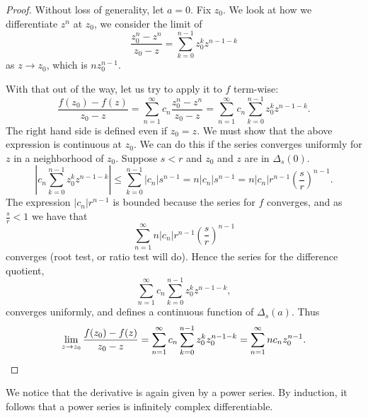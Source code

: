 \documentclass[12pt,openany]{book}
\newcommand{\sabs}[1]{\lvert {#1} \rvert}
\newcommand{\abs}[1]{\left\lvert {#1} \right\rvert}
\theoremstyle{plain}
\theoremstyle{remark}
\theoremstyle{definition}
\theoremstyle{exercise}
\theoremstyle{example}
\begin{document}
\begin{proof}
Without loss of generality, let $a=0$.
Fix $z_0$.
We look at how we differentiate $z^n$ at $z_0$,
we consider the limit of
\begin{equation*}
\frac{z_0^n-z^n}{z_0-z}
=
\sum_{k=0}^{n-1}
z_0^k z^{n-1-k}
\end{equation*}
as $z \to z_0$, which is $n z_0^{n-1}$.

With that out of the way, let us try to apply it to $f$
term-wise:
\begin{equation*}
\frac{f(z_0) - f(z)}{z_0-z}
=
\sum_{n=1}^\infty c_n \frac{z_0^n-z^n}{z_0-z}
=
\sum_{n=1}^\infty c_n \sum_{k=0}^{n-1} z_0^k z^{n-1-k} .
\end{equation*}
The right hand side is defined even if $z_0 = z$.
We must show that the above expression is continuous at $z_0$.
We can do this if the series converges uniformly for $z$ in a
neighborhood of $z_0$.  Suppose $s < r$ and $z_0$ and $z$ are
in $\Delta_s(0)$.
\begin{equation*}
\abs{c_n \sum_{k=0}^{n-1} z_0^k z^{n-1-k}}
\leq
\sum_{k=0}^{n-1} 
\sabs{c_n} s^{n-1}
=
n
\sabs{c_n} s^{n-1}
=
n
\sabs{c_n} r^{n-1} {\left(\frac{s}{r}\right)}^{n-1} .
\end{equation*}
The expression
$\sabs{c_n} r^{n-1}$ is bounded because the series for $f$ converges,
and as $\frac{s}{r} < 1$ we have that
\begin{equation*}
\sum_{n=1}^\infty n \sabs{c_n} r^{n-1} {\left(\frac{s}{r}\right)}^{n-1} 
\end{equation*}
converges (root test, or ratio test will do).
Hence the series for the difference quotient,
\begin{equation*}
\sum_{n=1}^\infty c_n \sum_{k=0}^{n-1} z_0^k z^{n-1-k} ,
\end{equation*}
converges uniformly, and
defines a continuous function of $\Delta_s(a)$.  Thus
\begin{equation*}
\lim_{z \to z_0}
\frac{f(z_0)-f(z)}{z_0-z}
=
\sum_{n=1}^\infty c_n \sum_{k=0}^{n-1} z_0^k z_0^{n-1-k}
=
\sum_{n=1}^\infty n c_n z_0^{n-1} .
\qedhere
\end{equation*}
\end{proof}

We notice that the derivative is again given by a power series.
By induction, it follows that a power series is infinitely complex
differentiable.
\end{document}

